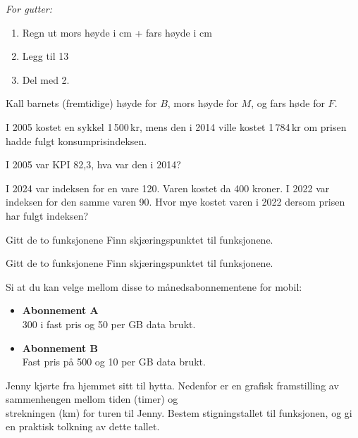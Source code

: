 \textit{For gutter:}
\begin{enumerate}
	\item Regn ut mors høyde i cm + fars høyde i cm
	\item Legg til 13 
	\item Del med 2.
\end{enumerate}
Kall barnets (fremtidige) høyde for $ B $, mors høyde for $ M $, og fars høde for $ F $.



I 2005 kostet en sykkel 1\,500\,kr, mens den i 2014 ville kostet 1\,784\,kr om prisen hadde fulgt konsumprisindeksen. \os

I 2005 var KPI 82,3, hva var den i 2014?

I 2024 var indeksen for en vare 120. Varen kostet da 400 kroner. I 2022 var indeksen
for den samme varen 90.
Hvor mye kostet varen i 2022 dersom prisen har fulgt indeksen?


Gitt de to funksjonene
Finn skjæringspunktet til funksjonene.

Gitt de to funksjonene
Finn skjæringspunktet til funksjonene.

Si at du kan velge mellom disse to månedsabonnementene for mobil:
\begin{itemize}
	\item[] \textbf{Abonnement A} \\
	300 i fast pris og 50 per GB data brukt.
	\item[] \textbf{Abonnement B} \\
	Fast pris på 500 og 10 per GB data brukt.
\end{itemize}

Jenny kjørte fra hjemmet sitt til hytta. Nedenfor er en grafisk framstilling av sammenhengen
mellom tiden (timer) og \\ strekningen (km) for turen til Jenny. \vs
{}
Bestem stigningstallet til funksjonen, og gi en praktisk tolkning av dette tallet.


